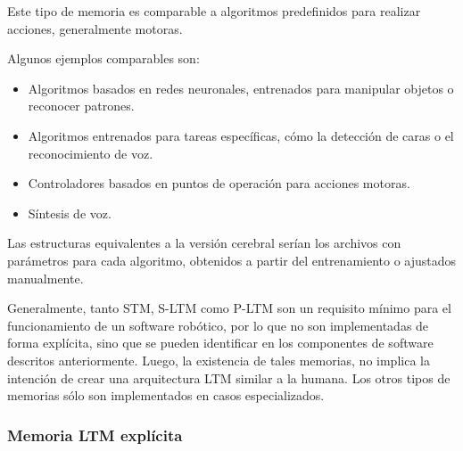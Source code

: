 
Este tipo de memoria es comparable a algoritmos predefinidos para realizar acciones, generalmente motoras. 

Algunos ejemplos comparables son: 
\begin{itemize}[topsep=0pt]
	\setlength\itemsep{0.2em}
	\item Algoritmos basados en redes neuronales, entrenados para manipular objetos o reconocer patrones.
	\item Algoritmos entrenados para tareas específicas, cómo la detección de caras o el reconocimiento de voz.
	\item Controladores basados en puntos de operación para acciones motoras.
	\item Síntesis de voz.
\end{itemize}

Las estructuras equivalentes a la versión cerebral serían los archivos con parámetros para cada algoritmo, obtenidos a partir del entrenamiento o ajustados manualmente.



Generalmente, tanto STM, S-LTM como P-LTM son un requisito mínimo para el funcionamiento de un software robótico, por lo que no son implementadas de forma explícita, sino que se pueden identificar en los componentes de software descritos anteriormente. Luego, la existencia de tales memorias, no implica la intención de crear una arquitectura LTM similar a la humana. Los otros tipos de memorias sólo son implementados en casos especializados.



\subsubsection{Memoria LTM explícita}\label{sec:ltm_exp}


